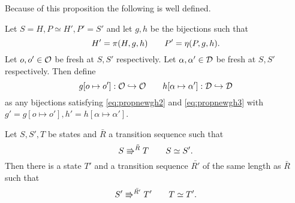 Because of this proposition the following is well defined.

\begin{definition}
  Let $S = H, P \simeq H', P' = S'$ and let $g, h$ be the bijections such that
  \begin{equation} \label{eq:propnewgh1}
    H' = \pi(H, g, h) \quad\quad P' = \eta(P, g, h).
  \end{equation}
  Let $o, o' \in \mathcal{O}$ be fresh at $S, S'$ respectively.
  Let $\alpha, \alpha' \in \mathcal{D}$ be fresh at $S, S'$ respectively.
  Then define
  \begin{equation}
    g[o \mapsto o']: \mathcal{O} \hookrightarrow \mathcal{O} 
    \quad\quad h[\alpha \mapsto \alpha']: \mathcal{D} \hookrightarrow \mathcal{D}
  \end{equation}
  as any bijections satisfying \eqref{eq:propnewgh2} and \eqref{eq:propnewgh3}
  with $g' = g[o \mapsto o'], h' = h[\alpha \mapsto \alpha']$.
\end{definition}

\begin{lemma} \label{lem:lemma3}
  Let $S, S', T$ be states and $\bar{R}$ a transition sequence such that
  \begin{equation*}
    S \Rrightarrow^{\bar{R}} T \quad\quad S \simeq S'.
  \end{equation*}
  Then there is a state $T'$ and a transition sequence $\bar{R'}$ of the same
  length as $\bar{R}$ such that
  \begin{equation*}
    S' \Rrightarrow^{\bar{R'}} T' \quad\quad T \simeq T'.
  \end{equation*}
\end{lemma}


